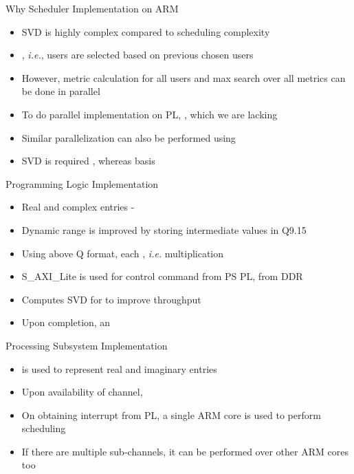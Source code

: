 \documentclass[11pt]{beamer}
\begin{document}
\begin{frame}{Why Scheduler Implementation on ARM}
	\begin{itemize}
		\item SVD is highly complex compared to scheduling complexity
		\item {}, \textit{i.e.}, users are selected based on previous chosen users
		\item However, metric calculation for all users and max search over all metrics can be done in parallel
		\item To do parallel implementation on PL, , which we are lacking
		\item Similar parallelization can also be performed using 
		\item SVD is required , whereas  basis
	\end{itemize}
\end{frame}


\begin{frame}{Programming Logic Implementation}
	\begin{itemize}
		\item Real and complex entries -  
		\item Dynamic range is improved by storing intermediate values in Q9.15
		\item Using above Q format, each , \textit{i.e.}  multiplication
		\item S\_AXI\_Lite is used for control command from PS \eqn{\to} PL,  from DDR
		\item Computes SVD for  to improve throughput
		\item Upon completion, an 
	\end{itemize}
\end{frame}

\begin{frame}{Processing Subsystem Implementation}
	\begin{itemize}
		\item {} is used to represent real and imaginary entries
		\item Upon availability of channel, 
		\item On obtaining interrupt from PL, a single ARM core is used to perform scheduling
		\item If there are multiple sub-channels, it can be performed over other ARM cores too
	\end{itemize}
\end{frame}
\end{document}
